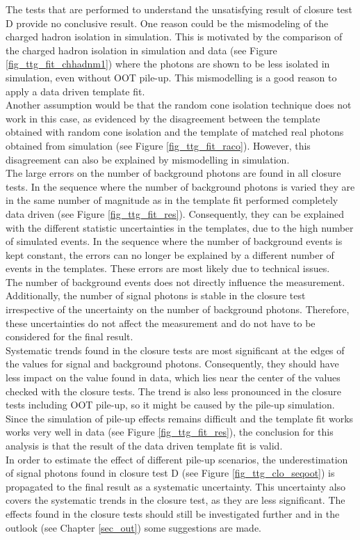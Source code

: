 The tests that are performed to understand the unsatisfying result of closure test D provide no conclusive result. One reason could be the mismodeling of the charged hadron isolation in simulation. This is motivated by the comparison of the charged hadron isolation in simulation and data (see Figure \ref{fig_ttg_fit_chhadnm1}) where the photons are shown to be less isolated in simulation, even without OOT pile-up. This mismodelling is a good reason to apply a data driven template fit.\\
Another assumption would be that the random cone isolation technique does not work in this case, as evidenced by the disagreement between the template obtained with random cone isolation and the template of matched real photons obtained from simulation (see Figure \ref{fig_ttg_fit_raco}). However, this disagreement can also be explained by mismodelling in simulation. \\
The large errors on the number of background photons are found in all closure tests. In the sequence where the number of background photons is varied they are in the same number of magnitude as in the template fit performed completely data driven (see Figure \ref{fig_ttg_fit_res}). Consequently, they can be explained with the different statistic uncertainties in the templates, due to the high number of simulated events. In the sequence where the number of background events is kept constant, the errors can no longer be explained 
by a different number of events in the templates. These errors are most likely due to technical issues.\\ 
The number of background events does not directly influence the measurement. Additionally, the number of signal photons is stable in the closure test irrespective of the uncertainty on the number of background photons. Therefore, these uncertainties do not affect the measurement and do not have to be considered for the final result. \\
Systematic trends found in the closure tests are most significant at the edges of the values for signal and background photons. Consequently, they should have less impact on the value found in data, which lies near the center of the values checked with the closure tests. The trend is also less pronounced in the closure tests including OOT pile-up, so it might be caused by the pile-up simulation. \\ 
Since the simulation of pile-up effects remains difficult and the template fit works works very well in data (see Figure \ref{fig_ttg_fit_res}), the conclusion for this analysis is that the result of the data driven template fit is valid.\\
In order to estimate the effect of different pile-up scenarios, the underestimation of signal photons found in closure test D (see Figure \ref{fig_ttg_clo_seqoot}) is propagated to the final result as a systematic uncertainty. This uncertainty also covers the systematic trends in the closure test, as they are less significant. The effects found in the closure tests should still be investigated further and in the outlook (see Chapter \ref{sec_out}) some suggestions are made.

